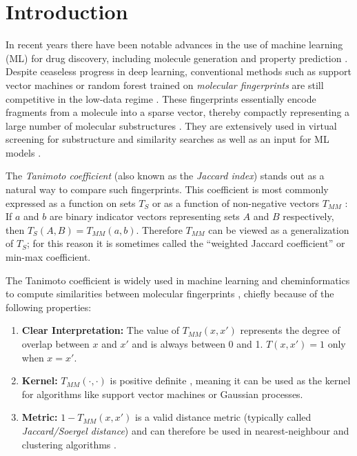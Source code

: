 \section{Introduction}

In recent years there have been notable advances in the use of machine learning (ML) for drug discovery, including molecule generation and property prediction \citep{dara2022machine}.
Despite ceaseless progress in deep learning,
conventional methods such as support vector machines or random forest trained on \emph{molecular fingerprints}
are still competitive in the low-data regime \citep{walters2020applications, stanley2021fs}.
These fingerprints essentially encode fragments from a molecule into a sparse vector,
thereby compactly representing a large number of molecular substructures \citep{david2020molecular}.
They are extensively used in virtual screening for substructure and similarity searches as well as an input for ML models \citep{cereto2015molecular, granda2018controlling}.

The \emph{Tanimoto coefficient}
(also known as the \emph{Jaccard index})
stands out as a natural way to compare such fingerprints.
This coefficient is most commonly expressed as a function on sets $T_S$
or as a function of non-negative vectors $T_{MM}$
\citep{jaccard1912distribution,tanimoto1958elementary,ralaivola2005graph,costa2021further,tan2016introduction}:
If $a$ and $b$ are binary indicator vectors representing sets $A$ and $B$
respectively,
then $T_S(A,B)=T_{MM}(a,b)$.
Therefore $T_{MM}$ can be viewed as a generalization of $T_S$;
for this reason it is sometimes called the ``weighted Jaccard coefficient''
or min-max coefficient.

The Tanimoto coefficient is widely used in machine learning and cheminformatics
to compute similarities between molecular fingerprints
\citep{bajusz2015tanimoto,o2016comparing,miranda2021differential},
chiefly because of the following properties:
\begin{enumerate}
    \item \textbf{Clear Interpretation:}
    The value of $T_{MM}(x,x')$ represents the degree of overlap between $x$ and $x'$
    and is always between 0 and 1.
    $T(x,x')=1$ only when $x=x'$.
    \item \textbf{Kernel:}
    $T_{MM}(\cdot,\cdot)$ is positive definite \citep{gower1971general,ralaivola2005graph},
    meaning it can be used as the kernel for algorithms like support vector machines or Gaussian processes.
    \item \textbf{Metric:}
    $1-T_{MM}(x,x')$ is a valid distance metric (typically called \emph{Jaccard/Soergel distance})
    and can therefore be used in nearest-neighbour and clustering algorithms \citep{marczewski1958certain,levandowsky1971distance}.
\end{enumerate}

